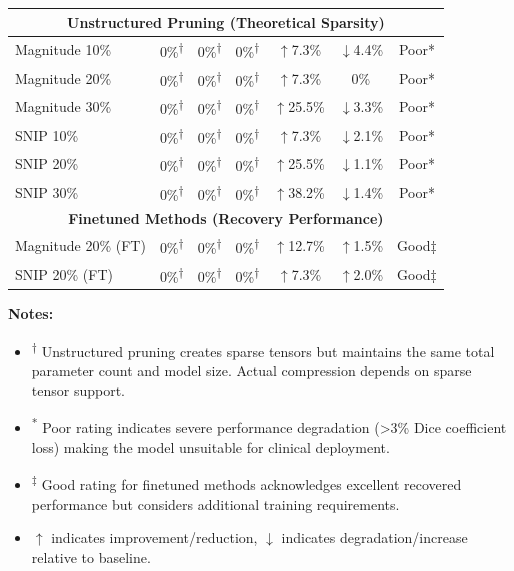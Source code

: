 \documentclass[12pt,a4paper]{article}
\begin{document}
\begin{enumerate}
\begin{table}[H]
{\begin{tabular}{|l|c|c|c|c|c|c|}
\hline
\multicolumn{7}{|c|}{\textbf{Unstructured Pruning (Theoretical Sparsity)}} \\
\hline
Magnitude 10\% & 0\%\textsuperscript{†} & 0\%\textsuperscript{†} & 0\%\textsuperscript{†} & {\color{green}$\uparrow$7.3\%} & {\color{red}$\downarrow$4.4\%} & {\color{red}Poor*} \\
Magnitude 20\% & 0\%\textsuperscript{†} & 0\%\textsuperscript{†} & 0\%\textsuperscript{†} & {\color{green}$\uparrow$7.3\%} & 0\% & {\color{red}Poor*} \\
Magnitude 30\% & 0\%\textsuperscript{†} & 0\%\textsuperscript{†} & 0\%\textsuperscript{†} & {\color{green}$\uparrow$25.5\%} & {\color{red}$\downarrow$3.3\%} & {\color{red}Poor*} \\
SNIP 10\% & 0\%\textsuperscript{†} & 0\%\textsuperscript{†} & 0\%\textsuperscript{†} & {\color{green}$\uparrow$7.3\%} & {\color{red}$\downarrow$2.1\%} & {\color{red}Poor*} \\
SNIP 20\% & 0\%\textsuperscript{†} & 0\%\textsuperscript{†} & 0\%\textsuperscript{†} & {\color{green}$\uparrow$25.5\%} & {\color{red}$\downarrow$1.1\%} & {\color{red}Poor*} \\
SNIP 30\% & 0\%\textsuperscript{†} & 0\%\textsuperscript{†} & 0\%\textsuperscript{†} & {\color{green}$\uparrow$38.2\%} & {\color{red}$\downarrow$1.4\%} & {\color{red}Poor*} \\
\hline
\multicolumn{7}{|c|}{\textbf{Finetuned Methods (Recovery Performance)}} \\
\hline
Magnitude 20\% (FT) & 0\%\textsuperscript{†} & 0\%\textsuperscript{†} & 0\%\textsuperscript{†} & {\color{green}$\uparrow$12.7\%} & {\color{green}$\uparrow$1.5\%} & {\color{green}Good‡} \\
SNIP 20\% (FT) & 0\%\textsuperscript{†} & 0\%\textsuperscript{†} & 0\%\textsuperscript{†} & {\color{green}$\uparrow$7.3\%} & {\color{green}$\uparrow$2.0\%} & {\color{green}Good‡} \\
\hline
\end{tabular}
}
\end{table}

\textbf{Notes:}
\begin{itemize}
    \item \textsuperscript{†} Unstructured pruning creates sparse tensors but maintains the same total parameter count and model size. Actual compression depends on sparse tensor support.
    \item \textsuperscript{*} Poor rating indicates severe performance degradation (>3\% Dice coefficient loss) making the model unsuitable for clinical deployment.
    \item \textsuperscript{‡} Good rating for finetuned methods acknowledges excellent recovered performance but considers additional training requirements.
    \item {\color{green}$\uparrow$} indicates improvement/reduction, {\color{red}$\downarrow$} indicates degradation/increase relative to baseline.
\end{itemize}


\end{enumerate}
\end{document}
